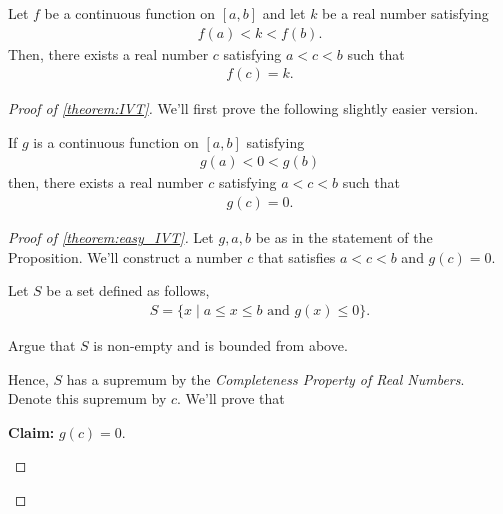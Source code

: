 \begin{theorem}
	\label{theorem:IVT}
	Let $f$ be a continuous function on $[a,b]$ and let $k$ be a real number satisfying
	\begin{align*}
		f(a) < k < f(b).
	\end{align*}
	Then, there exists a real number $c$ satisfying $a < c < b$ such that
	\begin{align*}
		f(c) = k.
	\end{align*}
\end{theorem}


\begin{proof}[Proof of \ref{theorem:IVT}]

	We'll first prove the following slightly easier version.
	\begin{prop}
		\label{theorem:easy_IVT}
		If $g$ is a continuous function on $[a,b]$ satisfying
		\begin{align*}
			g(a) < 0< g(b)
		\end{align*}
		then, there exists a real number $c$ satisfying $a < c < b$ such that
		\begin{align*}
			g(c) = 0.
		\end{align*}
	\end{prop}
	\begin{proof}[Proof of \ref{theorem:easy_IVT}]
		Let $g,a,b$ be as in the statement of the Proposition. We'll construct a number $c$ that satisfies $a < c < b$ and $g(c) = 0$.

		Let $S$ be a set defined as follows,
		\begin{align*}
			S = \{ x \mid a \le x \le b \mbox{ and } g(x) \le 0\}.
		\end{align*}
		\begin{exercise}
			Argue that $S$ is non-empty and is bounded from above.
		\end{exercise}
		Hence, $S$ has a supremum by the {\it Completeness Property of Real Numbers}. Denote this supremum by $c$. We'll prove that\\

    \begin{indentPara}
      {\bf Claim: } $g(c) = 0$.\\
    \end{indentPara}


\end{proof}
\end{proof}
